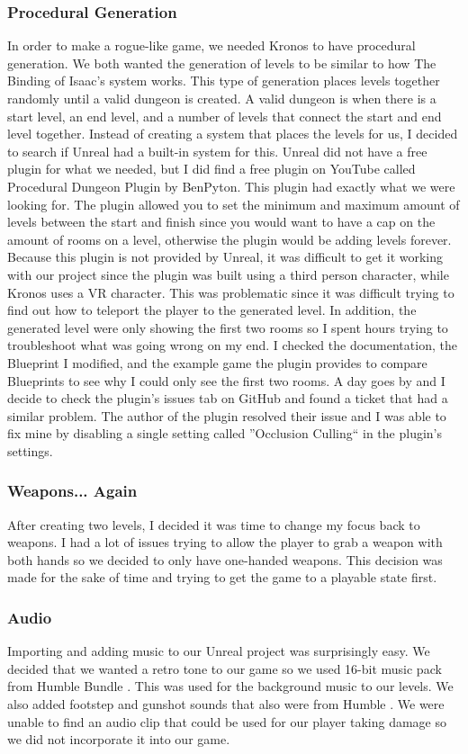 \documentclass{sigchi}
\begin{document}
\subsubsection*{Procedural Generation}
In order to make a rogue-like game, we needed Kronos to have procedural generation. We both wanted the generation of levels to be similar to how The Binding of Isaac's system works. This type of generation places levels together randomly until a valid dungeon is created. A valid dungeon is when there is a start level, an end level, and a number of levels that connect the start and end level together. Instead of creating a system that places the levels for us, I decided to search if Unreal had a built-in system for this. Unreal did not have a free plugin for what we needed, but I did find a free plugin on YouTube called Procedural Dungeon Plugin by BenPyton. This plugin had exactly what we were looking for. The plugin allowed you to set the minimum and maximum amount of levels between the start and finish since you would want to have a cap on the amount of rooms on a level, otherwise the plugin would be adding levels forever. Because this plugin is not provided by Unreal, it was difficult to get it working with our project since the plugin was built using a third person character, while Kronos uses a VR character. This was problematic since it was difficult trying to find out how to teleport the player to the generated level. In addition, the generated level were only showing the first two rooms so I spent hours trying to troubleshoot what was going wrong on my end. I checked the documentation, the Blueprint I modified, and the example game the plugin provides to compare Blueprints to see why I could only see the first two rooms. A day goes by and I decide to check the plugin's issues tab on GitHub and found a ticket that had a similar problem. The author of the plugin resolved their issue and I was able to fix mine by disabling a single setting called ''Occlusion Culling`` in the plugin's settings.\subsubsection*{Weapons... Again}
After creating two levels, I decided it was time to change my focus back to weapons. I had a lot of issues trying to allow the player to grab a weapon with both hands so we decided to only have one-handed weapons. This decision was made for the sake of time and trying to get the game to a playable state first.
\subsubsection*{Audio}
Importing and adding music to our Unreal project was surprisingly easy. We decided that we wanted a retro tone to our game so we used 16-bit music pack from Humble Bundle \cite{humble}. This was used for the background music to our levels. We also added footstep and gunshot sounds that also were from Humble \cite{humble}. We were unable to find an audio clip that could be used for our player taking damage so we did not incorporate it into our game. 
\end{document}
